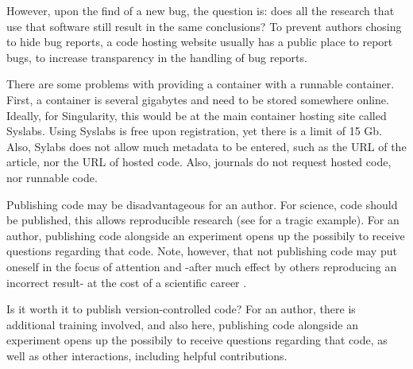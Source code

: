 
However, upon the find of a new bug, the question is:
does all the research that use that software still 
result in the same conclusions?
To prevent authors chosing to hide bug reports, 
a code hosting website usually has a public place to report bugs,
to increase transparency in the handling of bug reports.


There are some problems with providing a container with a runnable container.
First, a container is several gigabytes and need to be stored somewhere
online. 
Ideally, for Singularity, this would be at the main container hosting
site called Syslabs. Using Syslabs is free upon registration, 
yet there is a limit of 15 Gb. Also, Sylabs does not allow much metadata to
be entered, such as the URL of the article, nor the URL of hosted code.
Also, journals do not request hosted code, nor runnable code.


Publishing code may be disadvantageous for an author.
For science, code should be published, 
this allows reproducible research 
(see \cite{haibe2020importance} for a tragic example).
For an author, publishing code alongside an experiment opens up
the possibily to receive questions regarding that code.
Note, however, that not publishing code may put 
oneself in the focus of attention
and -after much effect by others reproducing an incorrect result-
at the cost of a scientific career \cite{baggerly2009deriving}.


Is it worth it to publish version-controlled code?
For an author, 
there is additional training involved, and also here,
publishing code alongside an experiment opens up
the possibily to receive questions regarding that code,
as well as other interactions, including helpful contributions.

